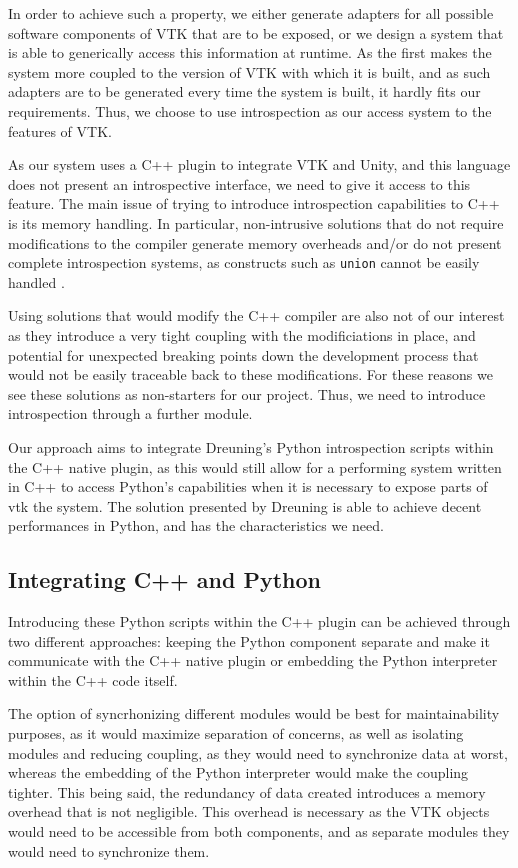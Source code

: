 In order to achieve such a property, we either generate adapters for all possible software components of VTK that are to be exposed, or we design a system that is able to generically access this information at runtime. As the first makes the system more coupled to the version of VTK with which it is built, and as such adapters are to be generated every time the system is built, it hardly fits our requirements. Thus, we choose to use introspection as our access system to the features of VTK.

As our system uses a C++ plugin to integrate VTK and Unity, and this language does not present an introspective interface, we need to give it access to this feature. The main issue of trying to introduce introspection capabilities to C++ is its memory handling. In particular, non-intrusive solutions that do not require modifications to the compiler generate memory overheads \cite{bayser2012rtti} and/or do not present complete introspection systems, as constructs such as \verb|union| cannot be easily handled \cite{tyng1998nonintrusive}.

Using solutions that would modify the C++ compiler are also not of our interest as they introduce a very tight coupling with the modificiations in place, and potential for unexpected breaking points down the development process that would not be easily traceable back to these modifications. For these reasons we see these solutions as non-starters for our project. Thus, we need to introduce introspection through a further module.

Our approach aims to integrate Dreuning's Python introspection scripts \cite{dreuning_visual_2016} within the C++ native plugin, as this would still allow for a performing system written in C++ to access Python's capabilities when it is necessary to expose parts of \acrshort{vtk} the system. The solution presented by Dreuning is able to achieve decent performances in Python, and has the characteristics we need.

\subsection{Integrating C++ and Python}

Introducing these Python scripts within the C++ plugin can be achieved through two different approaches: keeping the Python component separate and make it communicate with the C++ native plugin or embedding the Python interpreter within the C++ code itself.

The option of syncrhonizing different modules would be best for maintainability purposes, as it would maximize separation of concerns, as well as isolating modules and reducing coupling, as they would need to synchronize data at worst, whereas the embedding of the Python interpreter would make the coupling tighter. This being said, the redundancy of data created introduces a memory overhead that is not negligible. This overhead is necessary as the VTK objects would need to be accessible from both components, and as separate modules they would need to synchronize them. 

